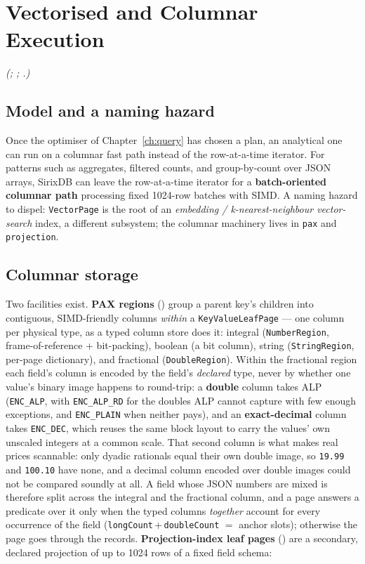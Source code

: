 \documentclass[11pt,a4paper,oneside]{report}
\theoremstyle{sirixthm}
\newcommand{\code}[1]{\texttt{#1}}
\begin{document}
\chapter{Vectorised and Columnar Execution}
\label{ch:vector}

\noindent\textit{(; ;
.)}

\section{Model and a naming hazard}

Once the optimiser of Chapter~\ref{ch:query} has chosen a plan, an analytical one can run on a
columnar fast path instead of the row-at-a-time iterator. For patterns such as aggregates,
filtered counts, and group-by-count over JSON arrays,
SirixDB can leave the row-at-a-time iterator for a \textbf{batch-oriented columnar path}
processing fixed 1024-row batches with SIMD. A naming hazard to dispel: \code{VectorPage} is
the root of an \emph{embedding / k-nearest-neighbour vector-search} index, a different
subsystem; the columnar machinery lives in \code{pax} and \code{projection}.

\section{Columnar storage}
\label{sec:vecstorage}

Two facilities exist. \textbf{PAX regions} () group a parent key's children
into contiguous, SIMD-friendly columns \emph{within} a \code{KeyValueLeafPage} --- one column per
physical type, as a typed column store does it: integral (\code{NumberRegion}, frame-of-reference
{+} bit-packing), boolean (a bit column), string (\code{StringRegion}, per-page dictionary), and
fractional (\code{DoubleRegion}). Within the fractional region each field's column is encoded by the
field's \emph{declared} type, never by whether one value's binary image happens to round-trip:
a \textbf{double} column takes ALP (\code{ENC\_ALP}, with \code{ENC\_ALP\_RD} for the doubles ALP
cannot capture with few enough exceptions, and \code{ENC\_PLAIN} when neither pays), and an
\textbf{exact-decimal} column takes \code{ENC\_DEC}, which reuses the same block layout to carry the
values' own unscaled integers at a common scale. That second column is what makes real prices
scannable: only dyadic rationals equal their own double image, so \code{19.99} and \code{100.10}
have none, and a decimal column encoded over double images could not be compared soundly at all.
A field whose JSON numbers are mixed is therefore split across the integral and the fractional
column, and a page answers a predicate over it only when the typed columns \emph{together} account
for every occurrence of the field (\code{longCount}\,{+}\,\code{doubleCount} $=$ anchor slots);
otherwise the page goes through the records. \textbf{Projection-index leaf pages}
() are a secondary, declared
projection of up to 1024 rows of a fixed field schema:
\end{document}
